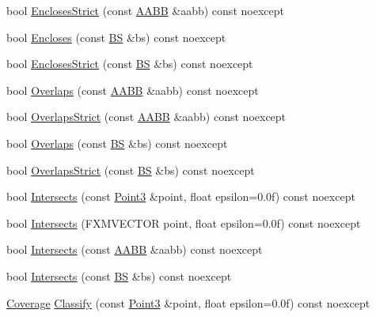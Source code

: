 \begin{DoxyCompactItemize}
\item 
bool \hyperlink{structmage_1_1_view_frustum_a7a0d293c4f3d1f29c54f45f00a7ca51f}{Encloses\+Strict} (const \hyperlink{structmage_1_1_a_a_b_b}{A\+A\+BB} \&aabb) const noexcept
\item 
bool \hyperlink{structmage_1_1_view_frustum_a779328d61928c60bfc0290d85eb79e4c}{Encloses} (const \hyperlink{structmage_1_1_b_s}{BS} \&bs) const noexcept
\item 
bool \hyperlink{structmage_1_1_view_frustum_a4300cf7690bc650ca521283496394997}{Encloses\+Strict} (const \hyperlink{structmage_1_1_b_s}{BS} \&bs) const noexcept
\item 
bool \hyperlink{structmage_1_1_view_frustum_a35c0afb66692cfd26a0e9bee2065892e}{Overlaps} (const \hyperlink{structmage_1_1_a_a_b_b}{A\+A\+BB} \&aabb) const noexcept
\item 
bool \hyperlink{structmage_1_1_view_frustum_a2eef224e458509eada25ec91a53753c6}{Overlaps\+Strict} (const \hyperlink{structmage_1_1_a_a_b_b}{A\+A\+BB} \&aabb) const noexcept
\item 
bool \hyperlink{structmage_1_1_view_frustum_ad7b492eaad1a93e650a8477045d5c0cb}{Overlaps} (const \hyperlink{structmage_1_1_b_s}{BS} \&bs) const noexcept
\item 
bool \hyperlink{structmage_1_1_view_frustum_a05963d6685c8cafc22be50c8e9b405df}{Overlaps\+Strict} (const \hyperlink{structmage_1_1_b_s}{BS} \&bs) const noexcept
\item 
bool \hyperlink{structmage_1_1_view_frustum_a68088c50a9d807df2059c1e95a0f1260}{Intersects} (const \hyperlink{structmage_1_1_point3}{Point3} \&point, float epsilon=0.\+0f) const noexcept
\item 
bool \hyperlink{structmage_1_1_view_frustum_af733e6632ce6f2911d4da4d0348733f6}{Intersects} (F\+X\+M\+V\+E\+C\+T\+OR point, float epsilon=0.\+0f) const noexcept
\item 
bool \hyperlink{structmage_1_1_view_frustum_a222e185f69a78f3c363423618f0a506d}{Intersects} (const \hyperlink{structmage_1_1_a_a_b_b}{A\+A\+BB} \&aabb) const noexcept
\item 
bool \hyperlink{structmage_1_1_view_frustum_a2925f619827d284c86ea5a68e694a8a8}{Intersects} (const \hyperlink{structmage_1_1_b_s}{BS} \&bs) const noexcept
\item 
\hyperlink{namespacemage_aa9fe157e5a578a103160266df8cccb0a}{Coverage} \hyperlink{structmage_1_1_view_frustum_a63f92adee12d18a78c6fc409dc92a917}{Classify} (const \hyperlink{structmage_1_1_point3}{Point3} \&point, float epsilon=0.\+0f) const noexcept

\end{DoxyCompactItemize}
